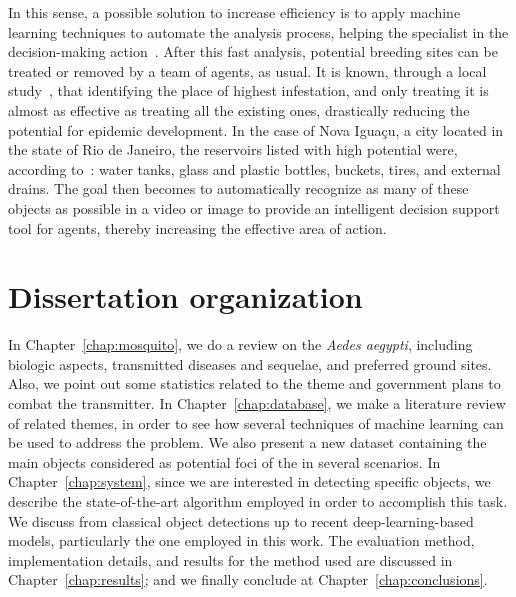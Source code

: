 In this sense, a possible solution to increase efficiency is to apply machine learning techniques to automate the analysis process, helping the specialist in the decision-making action~\cite{casfinal2018}.
After this fast analysis, potential breeding sites can be treated or removed by a team of agents, as usual.
It is known, through a local study~\cite{tun2009reducing}, that identifying the place of highest infestation, and only treating it is almost as effective as treating all the existing ones, drastically reducing the potential for epidemic development.
In the case of Nova Iguaçu, a city located in the state of Rio de Janeiro, the reservoirs listed with high potential were, according to~\cite{Lagrotta2006}: water tanks, glass and plastic bottles, buckets, tires, and external drains.
The goal then becomes to automatically recognize as many of these objects as possible in a video or image to provide an intelligent decision support tool for agents, thereby increasing the effective area of action.


\section{Dissertation organization}
%
In Chapter~\ref{chap:mosquito}, we do a review on the {\it Aedes aegypti}, including biologic aspects, transmitted diseases and sequelae, and preferred ground sites.
Also, we point out some statistics related to the theme and government plans to combat the transmitter.
In Chapter~\ref{chap:database}, we make a literature review of related themes, in order to see how several techniques of machine learning can be used to address the problem.
We also present a new dataset containing the main objects considered as potential foci of the \Aedes in several scenarios.
In Chapter~\ref{chap:system}, since we are interested in detecting specific objects, we describe the state-of-the-art algorithm employed in order to accomplish this task.
We discuss from classical object detections up to recent deep-learning-based models, particularly the one employed in this work.
The evaluation method, implementation details, and results for the method used are discussed in Chapter~\ref{chap:results}; and we finally conclude at Chapter~\ref{chap:conclusions}.


